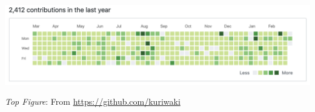 \documentclass[ignorenonframetext, 10pt, aspectratio=169]{beamer}
\begin{document}
\begin{frame}
\centering
\includegraphics[width = 0.9\linewidth]{portfolio.png}
\maketitle

\flushright
{\footnotesize \emph{Top Figure}: From \url{https://github.com/kuriwaki}}
\end{frame}
\end{document}
